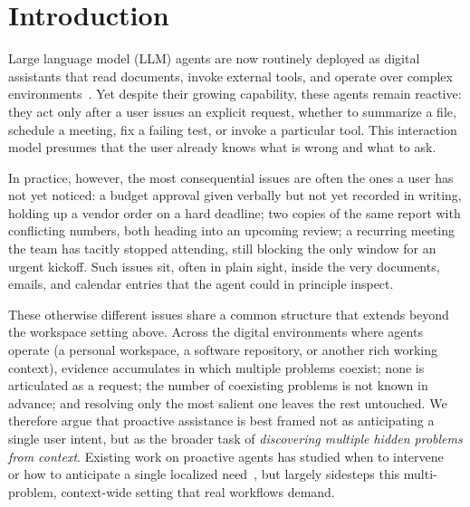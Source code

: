 \section{Introduction}



Large language model (LLM) agents are now routinely deployed as digital assistants that read documents, invoke external tools, and operate over complex environments~\cite{ReAct, SWE-agent, wu2024autogen}. Yet despite their growing capability, these agents remain reactive: they act only after a user issues an explicit request, whether to summarize a file, schedule a meeting, fix a failing test, or invoke a particular tool. This interaction model presumes that the user already knows what is wrong and what to ask.

In practice, however, the most consequential issues are often the ones a user has not yet noticed: a budget approval given verbally but not yet recorded in writing, holding up a vendor order on a hard deadline; two copies of the same report with conflicting numbers, both heading into an upcoming review; a recurring meeting the team has tacitly stopped attending, still blocking the only window for an urgent kickoff. Such issues sit, often in plain sight, inside the very documents, emails, and calendar entries that the agent could in principle inspect.

These otherwise different issues share a common structure that extends beyond the workspace setting above. Across the digital environments where agents operate (a personal workspace, a software repository, or another rich working context), evidence accumulates in which multiple problems coexist; none is articulated as a request; the number of coexisting problems is not known in advance; and resolving only the most salient one leaves the rest untouched. We therefore argue that proactive assistance is best framed not as anticipating a single user intent, but as the broader task of \textit{discovering multiple hidden problems from context}. Existing work on proactive agents has studied when to intervene~\cite{DBLP:conf/chi/LiuFSWIC25, DBLP:conf/emnlp/ZhangDLMKDCM25} or how to anticipate a single localized need~\cite{ProactiveAgent, ContextAgent, probe}, but largely sidesteps this multi-problem, context-wide setting that real workflows demand.

